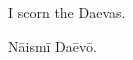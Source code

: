 \documentclass{book}
\begin{document}
\beforeeledchapter

\begin{pages}

\begin{Leftside}
\beginnumbering

\pstart
{}
\pend

\pstart
\centerline{I scorn the Daevas.}
\pend


\endnumbering
\end{Leftside}

\begin{Rightside}
\beginnumbering

\pstart
{}
\pend

\pstart
\centerline{Nāismī Daēvō.}
\pend

\endnumbering
\end{Rightside}

\end{pages}
\Pages
\end{document}
